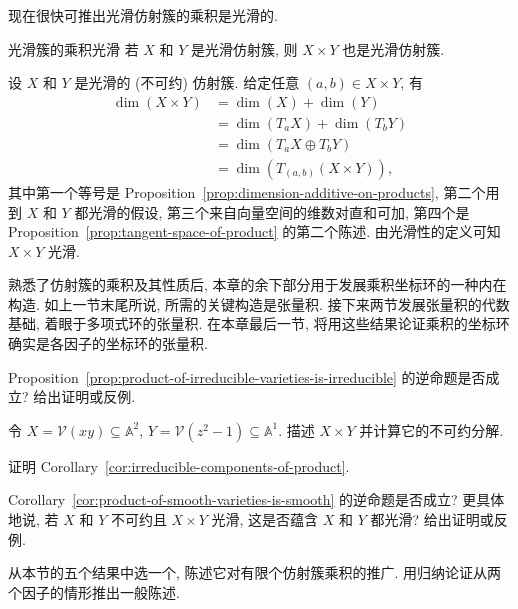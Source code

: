 现在很快可推出光滑仿射簇的乘积是光滑的.

\begin{Corollary}{光滑簇的乘积光滑}\leavevmode\label{cor:product-of-smooth-varieties-is-smooth}
若 $X$ 和 $Y$ 是光滑仿射簇, 则 $X\times Y$ 也是光滑仿射簇.
\end{Corollary}
\begin{Proof}
设 $X$ 和 $Y$ 是光滑的 (不可约) 仿射簇. 给定任意 $(a,b)\in X\times Y$, 有
\[
  \begin{aligned}
    \dim(X\times Y)&=\dim(X)+\dim(Y)\\
      &=\dim(T_{a}X)+\dim(T_{b}Y)\\
      &=\dim(T_{a}X\oplus T_{b}Y)\\
      &=\dim(T_{(a,b)}(X\times Y)),
  \end{aligned}
\]
其中第一个等号是 Proposition~\ref{prop:dimension-additive-on-products}, 第二个用到 $X$ 和 $Y$ 都光滑的假设, 第三个来自向量空间的维数对直和可加, 第四个是 Proposition~\ref{prop:tangent-space-of-product} 的第二个陈述. 由光滑性的定义可知 $X\times Y$ 光滑.
\end{Proof}

熟悉了仿射簇的乘积及其性质后, 本章的余下部分用于发展乘积坐标环的一种内在构造. 如上一节末尾所说, 所需的关键构造是张量积. 接下来两节发展张量积的代数基础, 着眼于多项式环的张量积. 在本章最后一节, 将用这些结果论证乘积的坐标环确实是各因子的坐标环的张量积.

\BookExerciseHeading
\begin{BookExercises}
  \item\label{ex:converse-of-product-irreducibility} Proposition~\ref{prop:product-of-irreducible-varieties-is-irreducible} 的逆命题是否成立? 给出证明或反例.
  \item\label{ex:irreducible-decomposition-of-axes-times-two-points} 令 $X=\mathcal{V}(xy)\subseteq\mathbb{A}^{2}$, $Y=\mathcal{V}(z^{2}-1)\subseteq\mathbb{A}^{1}$. 描述 $X\times Y$ 并计算它的不可约分解.
  \item\label{ex:prove-irreducible-components-of-product} 证明 Corollary~\ref{cor:irreducible-components-of-product}.
  \item\label{ex:converse-of-product-smoothness} Corollary~\ref{cor:product-of-smooth-varieties-is-smooth} 的逆命题是否成立? 更具体地说, 若 $X$ 和 $Y$ 不可约且 $X\times Y$ 光滑, 这是否蕴含 $X$ 和 $Y$ 都光滑? 给出证明或反例.
  \item\label{ex:generalize-product-property-to-many-factors} 从本节的五个结果中选一个, 陈述它对有限个仿射簇乘积的推广. 用归纳论证从两个因子的情形推出一般陈述.
\end{BookExercises}


